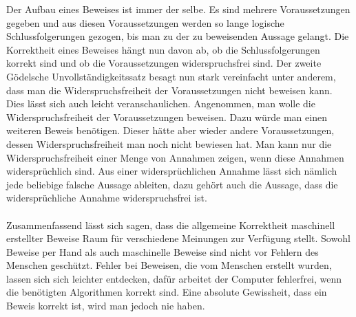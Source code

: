 Der Aufbau eines Beweises ist immer der selbe. Es sind mehrere Voraussetzungen gegeben und aus diesen Voraussetzungen werden so lange logische Schlussfolgerungen gezogen, bis man zu der zu beweisenden Aussage gelangt. Die Korrektheit eines Beweises hängt nun davon ab, ob die Schlussfolgerungen korrekt sind und ob die Voraussetzungen widerspruchsfrei sind. Der zweite Gödelsche Unvollständigkeitssatz besagt nun stark vereinfacht unter anderem, dass man die Widerspruchsfreiheit der Voraussetzungen nicht beweisen kann. Dies lässt sich auch leicht veranschaulichen. Angenommen, man wolle die Widerspruchsfreiheit der Voraussetzungen beweisen. Dazu würde man einen weiteren Beweis benötigen. Dieser hätte aber wieder andere Voraussetzungen, dessen Widerspruchsfreiheit man noch nicht bewiesen hat. Man kann nur die Widerspruchsfreiheit einer Menge von Annahmen zeigen, wenn diese Annahmen widersprüchlich sind. Aus einer widersprüchlichen Annahme lässt sich nämlich jede beliebige falsche Aussage ableiten, dazu gehört auch die Aussage, dass die widersprüchliche Annahme widerspruchsfrei ist.
\paragraph*{}Zusammenfassend lässt sich sagen, dass die allgemeine Korrektheit maschinell erstellter Beweise Raum für verschiedene Meinungen zur Verfügung stellt. Sowohl Beweise per Hand als auch maschinelle Beweise sind nicht vor Fehlern des Menschen geschützt. Fehler bei Beweisen, die vom Menschen erstellt wurden, lassen sich sich leichter entdecken, dafür arbeitet der Computer fehlerfrei, wenn die benötigten Algorithmen korrekt sind. Eine absolute Gewissheit, dass ein Beweis korrekt ist, wird man jedoch nie haben.

